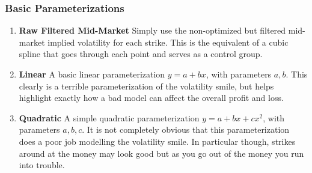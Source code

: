 \documentclass[12pt, a4paper, notitlepage]{article}
\numberwithin{equation}{subsection}
\numberwithin{figure}{subsection}
\numberwithin{table}{subsection}
\begin{document}
\subsubsection{Basic Parameterizations}\label{subsec:BasicParameterizations}
\begin{enumerate}
	\item \textbf{Raw Filtered Mid-Market}
    \newline Simply use the non-optimized but filtered mid-market implied volatility for each strike.  This is the equivalent of a cubic spline that goes through each point and serves as a control group.
    \item \textbf{Linear} 
    \newline A basic linear parameterization $y = a + bx$, with parameters $a,b$.  This clearly is a terrible parameterization of the volatility smile, but helps highlight exactly how a bad model can affect the overall profit and loss.
    \item \textbf{Quadratic}
    \newline A simple quadratic parameterization $y = a + bx + cx^2$, with parameters $a,b,c$.  It is not completely obvious that this parameterization does a poor job modelling the volatility smile.  In particular though, strikes around at the money may look good but as you go out of the money you run into trouble.
\end{enumerate}
\end{document}
